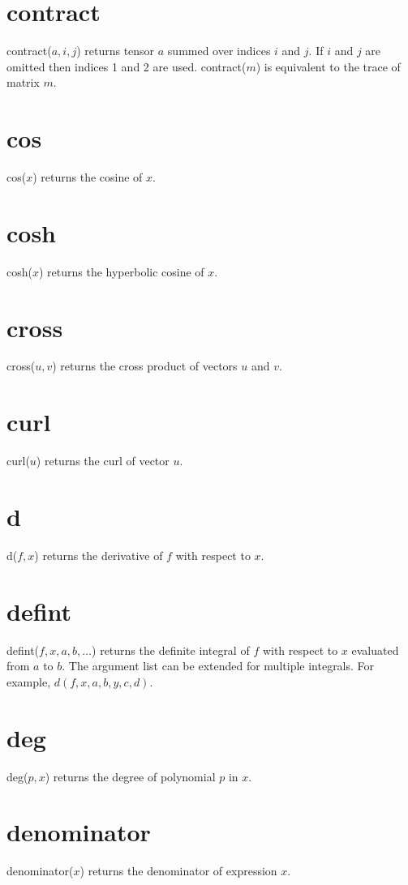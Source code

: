 \section*{contract}
contract($a,i,j$) returns tensor $a$ summed over indices $i$ and $j$.
If $i$ and $j$ are omitted then indices 1 and 2 are used.
contract($m$) is equivalent to the trace of matrix $m$.

\section*{cos}
cos($x$) returns the cosine of $x$.

\section*{cosh}
cosh($x$) returns the hyperbolic cosine of $x$.

\section*{cross}
cross($u,v$) returns the cross product of vectors $u$ and $v$.

\section*{curl}
curl($u$) returns the curl of vector $u$.

\section*{d}
d($f,x$) returns the derivative of $f$ with respect to $x$.

\section*{defint}
defint($f,x,a,b,\ldots$)
returns the definite integral of $f$ with respect to $x$ evaluated from $a$ to $b$.
The argument list can be extended for multiple integrals.
For example, $d(f,x,a,b,y,c,d)$.

\section*{deg}
deg($p,x$) returns the degree of polynomial $p$ in $x$.

\section*{denominator}
denominator($x$) returns the denominator of expression $x$.

